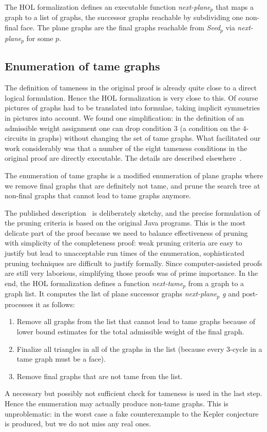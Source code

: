 \documentclass[11pt]{amsart}
\begin{document}
The HOL formalization defines an executable function
\textit{next-plane$_p$} that maps a
graph to a list of graphs, the successor graphs reachable by subdividing one
non-final face.  The plane graphs are the final graphs reachable from
\textit{Seed$_p$} via \textit{next-plane$_p$} for some $p$.

\subsection{Enumeration of tame graphs}

The definition of tameness in the original proof is already quite close to a direct logical
formulation. Hence the HOL formalization is very close to this. Of course
pictures of graphs had to be translated into formulae, taking implicit
symmetries in pictures into account. We found one simplification: in the
definition of an admissible weight assignment one can drop condition 3
(a condition on the $4$-circuits in graphs)
without changing the set of tame graphs. What facilitated our work
considerably was that a number of the eight tameness conditions 
in the original proof are directly
executable. The details are described elsewhere~\cite{NipkowBS-IJCAR06}.

The enumeration of tame graphs is a modified enumeration of plane graphs
where we remove final graphs that are definitely not tame, and prune the
search tree at non-final graphs that cannot lead to tame graphs anymore.  

The published
description~\cite{Hales:2006:DCG} is deliberately sketchy, and 
the precise formulation of the pruning criteria is based on the
original Java programs.  This
is the most delicate part of the proof because we need to balance
effectiveness of pruning with simplicity of the completeness proof: weak
pruning criteria are easy to justify but lead to unacceptable run times of
the enumeration, sophisticated pruning techniques are difficult to justify
formally. Since computer-assisted proofs are still very laborious,
simplifying those proofs was of prime importance. In the end, the HOL
formalization defines a function \textit{next-tame$_p$}
from a graph to a graph list. It computes the list of plane successor graphs
\textit{next-plane$_p$ g} and post-processes it as follows:
\begin{enumerate}
\item Remove all graphs from the list that cannot lead to tame graphs
because of lower bound estimates for the total admissible weight of the final
graph.
\item Finalize all triangles in all of the graphs in the list
(because every 3-cycle in a tame graph must be a face).
\item Remove final graphs that are not tame from the list.
\end{enumerate}
A necessary but possibly not sufficient check for tameness is used in the last
step. Hence the enumeration may actually produce non-tame graphs. This is
unproblematic: in the worst case a fake counterexample to the Kepler
conjecture is produced, but we do not miss any real ones.
\end{document}
